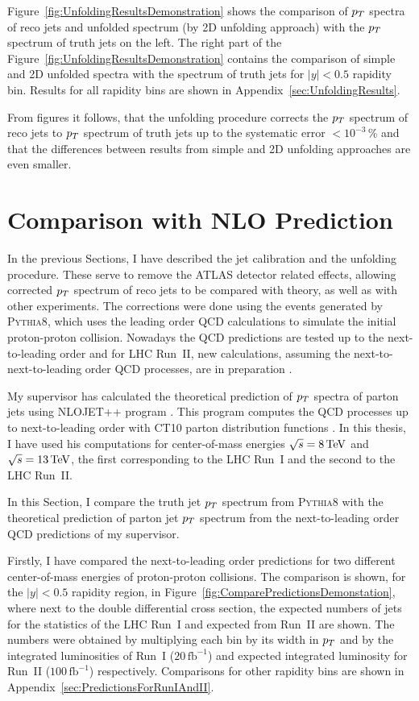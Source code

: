 Figure~\ref{fig:UnfoldingResultsDemonstration} shows the comparison of $p_{T}$
spectra of reco jets and unfolded spectrum (by 2D unfolding approach) with the
$p_{T}$ spectrum of truth jets on the left. The right part of the
Figure~\ref{fig:UnfoldingResultsDemonstration} contains the comparison of simple and 2D unfolded
spectra with the spectrum of truth jets for $|y|<0.5$ rapidity bin.
Results for all rapidity bins are shown in Appendix~\ref{sec:UnfoldingResults}.

From figures it follows, that the unfolding procedure corrects the
$p_{T}$ spectrum of reco jets to $p_{T}$ spectrum of truth jets up to the systematic
error $<10^{-3}\,\%$ and that the differences between results from simple and 2D
unfolding approaches are even smaller.

\section{Comparison with NLO Prediction}
\label{sec:ComaprisonWithNLOPrediction}

In the previous Sections, I have described the jet calibration and the unfolding
procedure. 
These serve to remove the ATLAS detector related effects, allowing corrected
$p_{T}$ spectrum of reco jets to be compared with theory, as well as with other
experiments. The corrections were done using the
events generated by \textsc{Pythia8}, which uses
the leading order QCD calculations to simulate the initial proton-proton collision.
Nowadays the QCD predictions are tested up to the next-to-leading order and for
LHC Run~II, new calculations, assuming the next-to-next-to-leading order QCD
processes, are in preparation \cite{NNLO1,NNLO2}.

My supervisor has calculated the theoretical prediction of $p_{T}$ spectra of
parton jets using \textsc{NLOJET++} program \cite{NLOJetProgram}. This
program computes the QCD processes up to next-to-leading order with CT10
parton distribution functions \cite{CT10PDF, Annecy}. In this thesis, I have used
his computations for center-of-mass energies $\sqrt{s}=8\,\text{TeV}$ and
$\sqrt{s}=13\,\text{TeV}$, the first corresponding to the LHC Run~I and the second to
the LHC Run~II. 

In this Section, I compare the truth jet $p_{T}$ spectrum from \textsc{Pythia8}
with the theoretical prediction of parton jet $p_{T}$ spectrum from the
next-to-leading order QCD predictions of my supervisor.

Firstly, I have compared the next-to-leading order predictions for two different
center-of-mass energies of proton-proton collisions.
The comparison is shown, for the $|y|<0.5$ rapidity region, in
Figure~\ref{fig:ComparePredictionsDemonstation}, where next to the double differential
cross section, the expected numbers of jets for the statistics of the LHC Run~I
and expected from Run~II are shown.
The numbers were obtained by multiplying each bin by its width in $p_{T}$ and
by the integrated luminosities of Run~I ($20\,\text{fb}^{-1}$) and expected
integrated luminosity for 
Run~II ($100\,\text{fb}^{-1}$) respectively. Comparisons for other rapidity bins
are shown in Appendix~\ref{sec:PredictionsForRunIAndII}.

